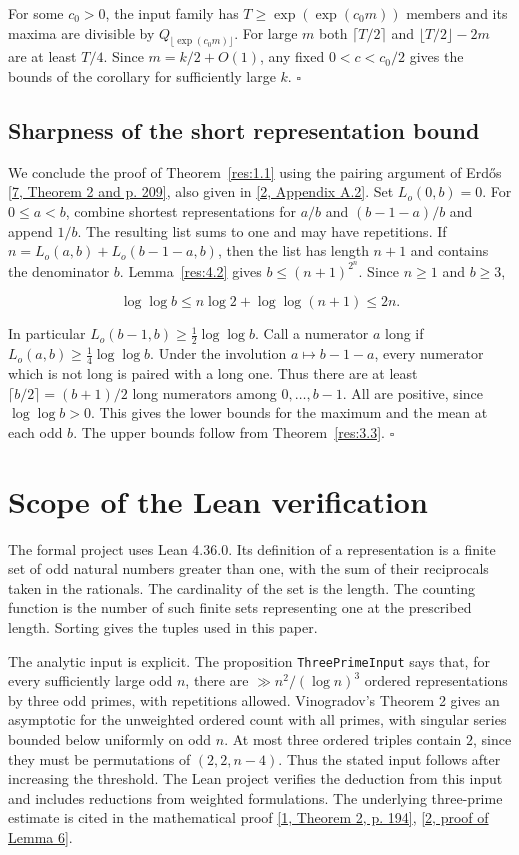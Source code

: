\documentclass[11pt,a4paper]{article}
\newcommand{\decl}[1]{\texttt{\small #1}}
\newcounter{result}[section]
\begin{document}
For some $c_0>0$, the input family has $T\ge\exp(\exp(c_0m))$ members and its maxima are divisible by $Q_{\lfloor\exp(c_0m)\rfloor}$. For large $m$ both $\lceil T/2\rceil$ and $\lfloor T/2\rfloor-2m$ are at least $T/4$. Since $m=k/2+O(1)$, any fixed $0<c<c_0/2$ gives the bounds of the corollary for sufficiently large $k$. $\square$

\subsection{Sharpness of the short representation bound}

We conclude the proof of Theorem~\ref{res:1.1} using the pairing argument of Erdős \hyperlink{ref-7}{[7, Theorem 2 and p. 209]}, also given in \hyperlink{ref-2}{[2, Appendix A.2]}. Set $L_o(0,b)=0$. For $0\le a<b$, combine shortest representations for $a/b$ and $(b-1-a)/b$ and append $1/b$. The resulting list sums to one and may have repetitions. If $n=L_o(a,b)+L_o(b-1-a,b)$, then the list has length $n+1$ and contains the denominator $b$. Lemma~\ref{res:4.2} gives $b\le(n+1)^{2^n}$. Since $n\ge1$ and $b\ge3$,

\[
\log\log b\le n\log 2+\log\log(n+1)\le 2n.
\]

In particular $L_o(b-1,b)\ge\frac12\log\log b$. Call a numerator $a$ long if $L_o(a,b)\ge\frac14\log\log b$. Under the involution $a\mapsto b-1-a$, every numerator which is not long is paired with a long one. Thus there are at least $\lceil b/2\rceil=(b+1)/2$ long numerators among $0,\ldots,b-1$. All are positive, since $\log\log b>0$. This gives the lower bounds for the maximum and the mean at each odd $b$. The upper bounds follow from Theorem~\ref{res:3.3}. $\square$

\appendix
\section{Scope of the Lean verification}

The formal project uses Lean 4.36.0. Its definition of a representation is a finite set of odd natural numbers greater than one, with the sum of their reciprocals taken in the rationals. The cardinality of the set is the length. The counting function is the number of such finite sets representing one at the prescribed length. Sorting gives the tuples used in this paper.

The analytic input is explicit. The proposition \decl{ThreePrimeInput} says that, for every sufficiently large odd $n$, there are $\gg n^2/(\log n)^3$ ordered representations by three odd primes, with repetitions allowed. Vinogradov's Theorem 2 gives an asymptotic for the unweighted ordered count with all primes, with singular series bounded below uniformly on odd $n$. At most three ordered triples contain $2$, since they must be permutations of $(2,2,n-4)$. Thus the stated input follows after increasing the threshold. The Lean project verifies the deduction from this input and includes reductions from weighted formulations. The underlying three-prime estimate is cited in the mathematical proof \hyperlink{ref-1}{[1, Theorem 2, p. 194]}, \hyperlink{ref-2}{[2, proof of Lemma 6]}.
\end{document}
